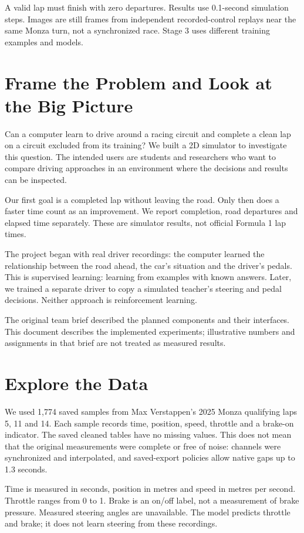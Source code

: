 \documentclass[11pt,a4paper]{article}
\begin{document}
A valid lap must finish with zero departures. Results use 0.1-second simulation steps. Images are still frames from independent recorded-control replays near the same Monza turn, not a synchronized race. Stage 3 uses different training examples and models.
\newpage
\section{Frame the Problem and Look at the Big Picture}
Can a computer learn to drive around a racing circuit and complete a clean lap on a circuit excluded from its training? We built a 2D simulator to investigate this question. The intended users are students and researchers who want to compare driving approaches in an environment where the decisions and results can be inspected.

Our first goal is a completed lap without leaving the road. Only then does a faster time count as an improvement. We report completion, road departures and elapsed time separately. These are simulator results, not official Formula 1 lap times.

The project began with real driver recordings: the computer learned the relationship between the road ahead, the car's situation and the driver's pedals. This is supervised learning: learning from examples with known answers. Later, we trained a separate driver to copy a simulated teacher's steering and pedal decisions. Neither approach is reinforcement learning.

The original team brief described the planned components and their interfaces. This document describes the implemented experiments; illustrative numbers and assignments in that brief are not treated as measured results.
\section{Explore the Data}
We used 1,774 saved samples from Max Verstappen's 2025 Monza qualifying laps 5, 11 and 14. Each sample records time, position, speed, throttle and a brake-on indicator. The saved cleaned tables have no missing values. This does not mean that the original measurements were complete or free of noise: channels were synchronized and interpolated, and saved-export policies allow native gaps up to 1.3 seconds.

Time is measured in seconds, position in metres and speed in metres per second. Throttle ranges from 0 to 1. Brake is an on/off label, not a measurement of brake pressure. Measured steering angles are unavailable. The model predicts throttle and brake; it does not learn steering from these recordings.
\end{document}
